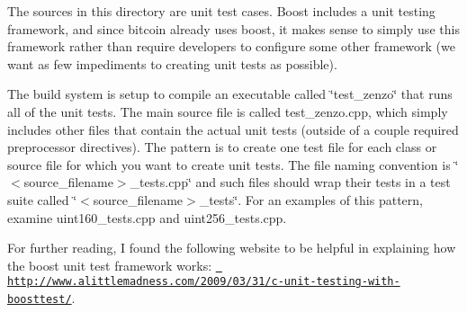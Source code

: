 The sources in this directory are unit test cases. Boost includes a unit testing framework, and since bitcoin already uses boost, it makes sense to simply use this framework rather than require developers to configure some other framework (we want as few impediments to creating unit tests as possible).

The build system is setup to compile an executable called \char`\"{}test\+\_\+zenzo\char`\"{} that runs all of the unit tests. The main source file is called test\+\_\+zenzo.\+cpp, which simply includes other files that contain the actual unit tests (outside of a couple required preprocessor directives). The pattern is to create one test file for each class or source file for which you want to create unit tests. The file naming convention is \char`\"{}$<$source\+\_\+filename$>$\+\_\+tests.\+cpp\char`\"{} and such files should wrap their tests in a test suite called \char`\"{}$<$source\+\_\+filename$>$\+\_\+tests\char`\"{}. For an examples of this pattern, examine uint160\+\_\+tests.\+cpp and uint256\+\_\+tests.\+cpp.

For further reading, I found the following website to be helpful in explaining how the boost unit test framework works\+: \href{http://www.alittlemadness.com/2009/03/31/c-unit-testing-with-boosttest/}{\texttt{ http\+://www.\+alittlemadness.\+com/2009/03/31/c-\/unit-\/testing-\/with-\/boosttest/}}. 